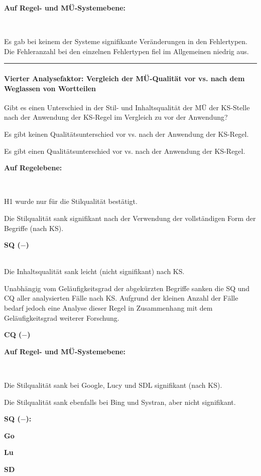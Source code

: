 \noindent
\parbox[t]{.8\textwidth}{\textbf{Auf Regel- und MÜ-Systemebene:}}\\
\parbox[t]{.8\textwidth}{
Es gab bei keinem der Systeme signifikante Veränderungen in den Fehlertypen. Die Fehleranzahl bei den einzelnen Fehlertypen fiel im Allgemeinen niedrig aus.
}
\parbox[t]{.04\textwidth}{}
\parbox[t]{.15\textwidth}{}
\smallskip
\hrule
\paragraph*{Vierter Analysefaktor: Vergleich der MÜ-Qualität vor vs. nach dem Weglassen von Wortteilen}
\begin{description}[font=\normalfont\bfseries]
\item [Fragestellung:] Gibt es einen Unterschied in der Stil- und Inhaltsqualität der MÜ der KS-Stelle nach der Anwendung der KS-Regel im Vergleich zu vor der Anwendung?
\item [H0 --] Es gibt keinen Qualitätsunterschied vor vs. nach der Anwendung der KS-Regel.
\item [H1 --] Es gibt einen Qualitätsunterschied vor vs. nach der Anwendung der KS-Regel.
\item [Resultat]
\end{description}
\noindent
\parbox[t]{.8\textwidth}{\textbf{Auf Regelebene:}}\\
\parbox[t]{.8\textwidth}{
H1 wurde nur für die Stilqualität bestätigt.

Die Stilqualität sank signifikant nach der Verwendung der vollständigen Form der Begriffe (nach KS).
}
\parbox[t]{.04\textwidth}{}
\colorbox{smGreen}{\parbox[t]{.15\textwidth}{\textbf{SQ ($-$)}\\
\\
}}

\medskip
\noindent
\parbox[t]{.8\textwidth}{
Die Inhaltsqualität sank leicht (nicht signifikant) nach KS.

Unabhängig vom Geläufigkeitsgrad der abgekürzten Begriffe sanken die SQ und CQ aller analysierten Fälle nach KS. Aufgrund der kleinen Anzahl der Fälle bedarf jedoch eine Analyse dieser Regel in Zusammenhang mit dem Geläufigkeitsgrad weiterer Forschung.
}
\parbox[t]{.04\textwidth}{}
\parbox[t]{.15\textwidth}{\textbf{CQ ($-$)}}

\noindent
\parbox[t]{.8\textwidth}{\textbf{Auf Regel- und MÜ-Systemebene:}}\\
\parbox[t]{.8\textwidth}{
Die Stilqualität sank bei Google, Lucy und SDL signifikant (nach KS).

Die Stilqualität sank ebenfalls bei Bing und Systran, aber nicht signifikant.
}
\parbox[t]{.04\textwidth}{}
\colorbox{smGreen}{\parbox[t]{.15\textwidth}{
{ \textbf{SQ ($-$):}}

{ \textbf{Go}}

{ \textbf{Lu}}

\textbf{SD}
}}

